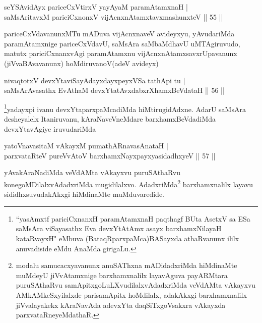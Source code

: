 
\begin{shl}
seYSA\s vidAyx pariceCxVtirxV yayA\s yaM paramAtamxnaH |\\
saMsAritavxM pariciCxnonxV vijAcnxnAtamxtavxmashunxteV \hfill || 55 ||
\end{shl}

\begin{artha}
pariceCxVdavanunxMTu mADuva vijAcnxnaveV avideyxyu, yAvudariMda paramAtamxnige 
pariceCxVdavU, saMsAra saMbaMdhavU uMTAgiruvudo, matutx pariciCxnanxvAgi paramAtamxnu 
vijAcnxnAtamxsavxrUpavanunx (jiVvaBAvavanunx) hoMdiruvanoV(adeV avideyx)
\end{artha}

\begin{shl}
nivaqtotxV devxYtaviSayAdayxdayxpeyxVSa tathA\s pi tu |\\
saMsArAvasathx EvAthaM devxYtatAvxdabxrXhamxBeVdataH \hfill || 56 ||
\end{shl}

\begin{artha}
\footnote{``yasAmxtf pariciCxnanxH paramAtamxnaH paqthagf BUta AsetxV sa ESa saMsAra viSayasathx Eva devxYtAtAmx asayx barxhamxNilayaH kataRvayxH" eMbuva (BataqRparxpaMca)BASayxda athaRvanunx ililx anuvadiside eMdu AnaMda girigaLu.}yadayxpi ivanu devxYtaparxpaMcadiMda hiMtirugidAdxne. AdarU saMsAra desheyalelx Itaniruvanu, kAraNaveVneMdare barxhamxBeVdadiMda devxYtavAgiye iruvudariMda
\end{artha}

\begin{shl}
yatoV\s navasitaM vAkayxM pumathARnavasAnataH |\\
parxvataRteV pureVvAtoV barxhamxNayxpayxyasidadhxyeV \hfill || 57 ||
\end{shl}

\begin{artha}
yAvakAraNadiMda veVdAMta vAkayxvu puruSAthaRvu konegoMDilalxvAdadxriMda mugidilalxvo. AdadxriMda\footnote{modalu samucacxyavanunx anuSAThxna mADidadxriMda hiMdinaMte muMdeyU jiVvAtamxnige barxhamxnalilx layavAguva payARMtara puruSAthaRvu samApitxgoLuLXvudilalxvAdadxriMda veVdAMta vAkayxvu AMkAMkeSxyilalxde parisamApitx hoMdilalx, adakAkxgi barxhamxnalilx jiVvalayakekx kAraNavAda adevxYta daqSiTxgoVsakxra vAkayxda parxvataRneyeMdathaR.} barxhamxnalilx layavu sididhxsuvudakAkxgi hiMdinaMte muMduvaredide.
\end{artha}

